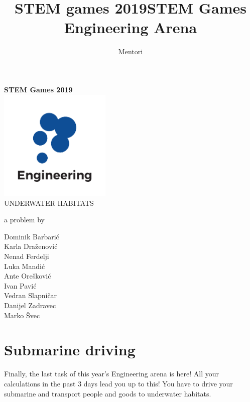 \documentclass{article}
\title{STEM games 2019}
\author{Mentori}
\title{STEM Games Engineering Arena}
\date{}
\begin{document}
	
	\thispagestyle{empty}
	\newpage
	\thispagestyle{empty}
	\vspace*{0cm}
	\begin{center}
		
		\textbf{\Huge{STEM Games 2019}}\\
		\vspace*{2.4cm}
		\includegraphics[width=0.4\textwidth]{logos/engineering} \\
		\vspace*{2.4cm}
		\huge{UNDERWATER HABITATS}
		
		\medskip
		
		\normalsize{a problem by}
		
		\medskip
		
		Dominik Barbarić \\
		Karla Draženović \\
		Nenad Ferdelji \\
		Luka Mandić \\
		Ante Orešković \\
		Ivan Pavić \\
		Vedran Slapničar \\
		Danijel Zadravec \\
		Marko Švec 
		
		\vspace{6cm}
		
		
		\normalsize{}
	\end{center}
	
	\newpage
	
	
\section{Submarine driving}

Finally, the last task of this year's Engineering arena is here! All your calculations in the past 3 days lead you up to this! You have to drive your submarine and transport people and goods to underwater habitats.
\end{document}
